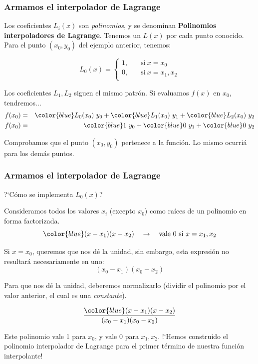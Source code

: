 \documentclass[11pt,xcolor={rgb}]{beamer}
\begin{document}
\begin{frame}[fragile=singleslide]
\frametitle{Armamos el interpolador de Lagrange}


Los coeficientes $L_i(x)$ son \textit{polinomios}, y se denominan \textbf{Polinomios interpoladores de Lagrange}. Tenemos un $L(x)$ por cada punto conocido. Para el punto $(x_0,y_0)$ del ejemplo anterior, tenemos:

\[   
L_0(x) = 
     \begin{cases}
       1, &\quad\text{si}\ x=x_0\\
       0, &\quad\text{si}\ x = x_1,x_2 \\
     \end{cases}
\]

Los coeficientes $L_1, L_2$ siguen el mismo patr\'on. Si evaluamos $f(x)$ en $x_0$, tendremos...\\
\begin{eqnarray*}
f(x_0) &=& {\color{blue}L_0(x_0)}\ y_0 + {\color{blue}L_1(x_0)}\ y_1 + {\color{blue}L_2(x_0)}\ y_2\\
f(x_0) &=& {\color{blue}1}\ y_0 + {\color{blue}0}\ y_1 + {\color{blue}0}\ y_2\\
\end{eqnarray*}

Comprobamos que el punto $(x_0, y_0)$ pertenece a la funci\'on. Lo mismo ocurri\'a para los dem\'as puntos.

\end{frame}


\begin{frame}[fragile=singleslide]
\frametitle{Armamos el interpolador de Lagrange}

?`C\'omo se implementa $L_0(x)$?

Consideramos todos los valores $x_i$ (excepto $x_0$) como ra\'ices de un polinomio en forma factorizada. 
$${\color{blue}(x-x_1)(x-x_2)}\quad \rightarrow \quad \text{vale 0 si } x=x_1,x_2$$

Si $x=x_0$, queremos que nos d\'e la unidad, sin embargo, esta expresi\'on no resultar\'a necesariamente en uno:
$$(x_0-x_1)(x_0-x_2)$$

Para que nos d\'e la unidad, deberemos normalizarlo (dividir el polinomio por el valor anterior, el cual es una \textit{constante}).

$$\frac{{\color{blue}(x-x_1)(x-x_2)}}{(x_0-x_1)(x_0-x_2)}$$

Este polinomio vale 1 para $x_0$, y vale 0 para $x_1, x_2$. !`Hemos construido el polinomio interpolador de Lagrange para el primer t\'ermino de nuestra funci\'on interpolante!

\end{frame}
\end{document}
